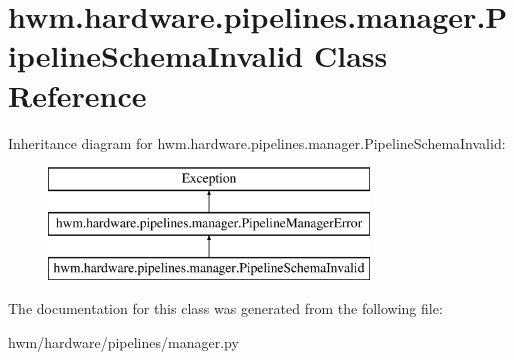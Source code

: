 \hypertarget{classhwm_1_1hardware_1_1pipelines_1_1manager_1_1_pipeline_schema_invalid}{\section{hwm.\-hardware.\-pipelines.\-manager.\-Pipeline\-Schema\-Invalid Class Reference}
\label{classhwm_1_1hardware_1_1pipelines_1_1manager_1_1_pipeline_schema_invalid}
}
Inheritance diagram for hwm.\-hardware.\-pipelines.\-manager.\-Pipeline\-Schema\-Invalid\-:\begin{figure}[H]
\begin{center}
\leavevmode
\includegraphics[height=3.000000cm]{classhwm_1_1hardware_1_1pipelines_1_1manager_1_1_pipeline_schema_invalid}
\end{center}
\end{figure}


The documentation for this class was generated from the following file\-:\begin{DoxyCompactItemize}
\item 
hwm/hardware/pipelines/manager.\-py\end{DoxyCompactItemize}
